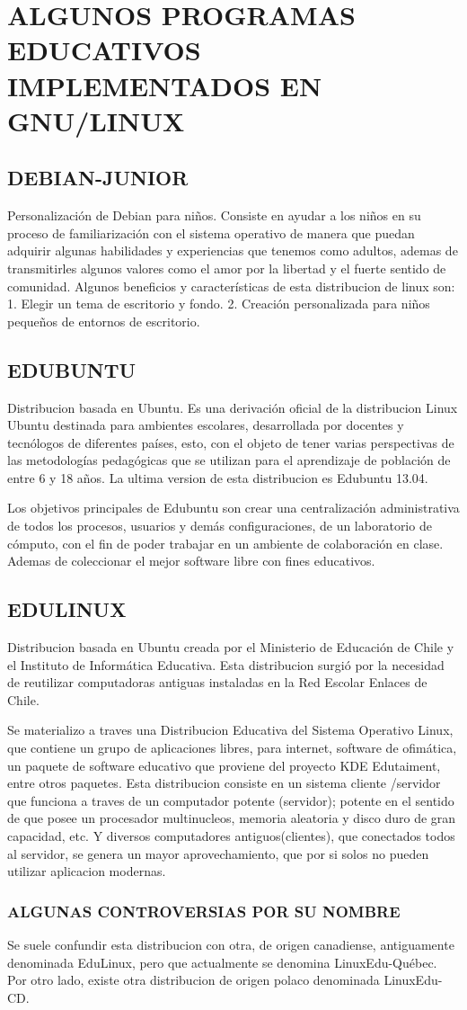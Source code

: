 \section*{ALGUNOS PROGRAMAS EDUCATIVOS IMPLEMENTADOS EN GNU/LINUX}
\subsection*{DEBIAN-JUNIOR}
Personalización de Debian para niños.
Consiste en ayudar a los niños en su proceso de familiarización
con el sistema operativo de manera que puedan adquirir algunas
habilidades y experiencias que tenemos como adultos, ademas
de transmitirles algunos valores como el amor por la libertad y
el fuerte sentido de comunidad.
Algunos beneficios y características de esta distribucion de linux
son:
1. Elegir un tema de escritorio y fondo.
2. Creación personalizada para niños pequeños de entornos de
escritorio.
\subsection*{EDUBUNTU}
Distribucion basada en Ubuntu.
Es una derivación oficial de la distribucion Linux Ubuntu
destinada para ambientes escolares, desarrollada por docentes y
tecnólogos de diferentes países, esto, con el objeto de tener
varias perspectivas de las metodologías pedagógicas que se
utilizan para el aprendizaje de población de entre 6 y 18 años.
La ultima version de esta distribucion es Edubuntu 13.04.

Los objetivos principales de Edubuntu son crear una
centralización administrativa de todos los procesos, usuarios y
demás configuraciones, de un laboratorio de cómputo, con el fin
de poder trabajar en un ambiente de colaboración en clase.
Ademas de coleccionar el mejor software libre con fines
educativos.

\subsection*{EDULINUX}
Distribucion basada en Ubuntu creada por el
Ministerio de Educación de Chile y el Instituto de Informática
Educativa.
Esta distribucion surgió por la necesidad de reutilizar
computadoras antiguas instaladas en la Red Escolar Enlaces de
Chile.

Se materializo a traves una Distribucion Educativa del Sistema
Operativo Linux, que contiene un grupo de aplicaciones libres,
para internet, software de ofimática, un paquete de software
educativo que proviene del proyecto KDE Edutaiment, entre
otros paquetes. Esta distribucion consiste en un sistema
cliente /servidor que funciona a traves de un computador
potente (servidor); potente en el sentido de que posee un
procesador multinucleos, memoria aleatoria y disco duro de
gran capacidad, etc. Y diversos computadores antiguos(clientes),
que conectados todos al servidor, se genera un mayor
aprovechamiento, que por si solos no pueden utilizar aplicacion
modernas.

\subsubsection*{ALGUNAS CONTROVERSIAS POR SU NOMBRE}

Se suele confundir esta distribucion con otra, de origen
canadiense, antiguamente denominada EduLinux, pero que
actualmente se denomina LinuxEdu-Québec.
Por otro lado, existe otra distribucion de origen polaco
denominada LinuxEdu-CD.


